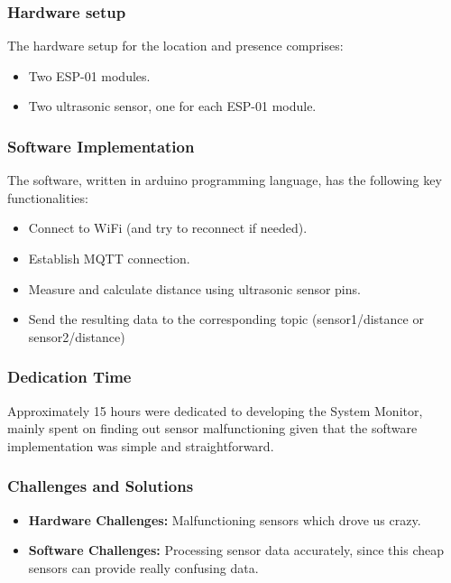 \subsubsection{Hardware setup}
The hardware setup for the location and presence comprises:
\begin{itemize}
    \item Two ESP-01 modules.
    \item Two ultrasonic sensor, one for each ESP-01 module.
\end{itemize}

\subsubsection{Software Implementation}
The software, written in arduino programming language, has the following key functionalities:
\begin{itemize}
    \item Connect to WiFi (and try to reconnect if needed).
    \item Establish MQTT connection.
    \item Measure and calculate distance using ultrasonic sensor pins.
    \item Send the resulting data to the corresponding topic (sensor1/distance or sensor2/distance)
\end{itemize}

\subsubsection{Dedication Time}
Approximately 15 hours were dedicated to developing the System Monitor, mainly spent on finding out sensor malfunctioning given that the software implementation was simple and straightforward.

\subsubsection{Challenges and Solutions}
\begin{itemize}
    \item \textbf{Hardware Challenges:} Malfunctioning sensors which drove us crazy.
    \item \textbf{Software Challenges:} Processing sensor data accurately, since this cheap sensors can provide really confusing data.
\end{itemize}

